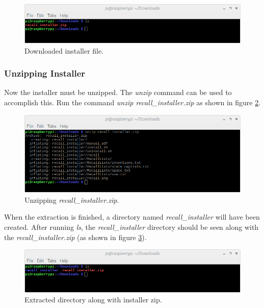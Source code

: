 \documentclass[letterpaper]{article}
\begin{document}
\begin{figure}[H]
  \centering
  \includegraphics[width=14cm]{images/command_line_install/downloaded_zip.png}
  \caption{Downloaded installer file.}
  \label{fig:recall_installer.zip}
\end{figure}
  
\subsubsection{Unzipping Installer}

Now the installer must be unzipped. The \textit{unzip} command can be used to accomplish this. Run the command \textit{unzip recall\_installer.zip} as shown in figure \ref{fig:cammand_line_unzip}.

\begin{figure}[H]
  \centering
  \includegraphics[width=14cm]{images/command_line_install/unzip.png}
  \caption{Unzipping \textit{recall\_installer.zip}.}
  \label{fig:cammand_line_unzip}
\end{figure}

When the extraction is finished, a directory named \textit{recall\_installer} will have been created. After running \textit{ls}, the \textit{recall\_installer} directory should be seen along with the \textit{recall\_installer.zip} (as shown in figure \ref{fig:ls_folder_and_zip}).

\begin{figure}[H]
  \centering
  \includegraphics[width=14cm]{images/command_line_install/folder_with_zip.png}
  \caption{Extracted directory along with installer zip.}
  \label{fig:ls_folder_and_zip}
\end{figure}
\end{document}
